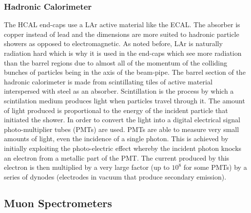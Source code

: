 \subsubsection{Hadronic Calorimeter} The HCAL end-caps use a LAr active material
like the ECAL. The absorber is copper instead of lead and the dimensions are
more suited to hadronic particle showers as opposed to electromagnetic. As noted
before, LAr is naturally radiation hard which is why it is used in the end-caps
which see more radiation than the barrel regions due to almost all of the
momentum of the colliding bunches of particles being in the axis of the
beam-pipe. The barrel section of the hadronic calorimeter is made from
scintillating tiles of active material interspersed with steel as an absorber.
Scintillation is the process by which a scintilation medium produces light when
particles travel through it. The amount of light produced is proportional to the
energy of the incident particle that initiated the shower. In order to convert
the light into a digital electrical signal photo-multiplier tubes (PMTs) are
used. PMTs are able to measure very small amounts of light, even the incidence
of a single photon. This is achieved by initially exploiting the photo-electric
effect whereby the incident photon knocks an electron from a metallic part of
the PMT. The current produced by this electron is then multiplied by a very
large factor (up to $10^8$ for some PMTs) by a series of dynodes (electrodes in
vacuum that produce secondary emission).


\subsection{Muon Spectrometers}%
\label{sec:muon}

